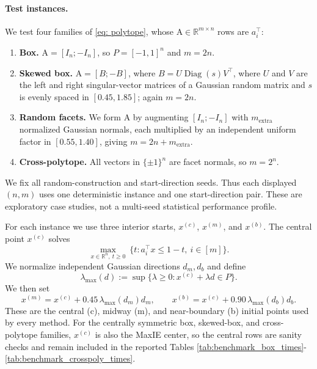 \documentclass[smallextended]{svjour3}
\DeclareMathOperator{\Diag}{Diag}
\newcommand{\R}{\mathbb{R}}
\begin{document}
\paragraph{Test instances.}
We test four families of \eqref{eq: polytope}, whose
$\mathrm{A}\in\R^{m\times n}$ rows are $a_i^\top$:
\begin{enumerate}
\item \textbf{Box.} $\mathrm{A}=[I_n;-I_n]$, so $P=[-1,1]^n$ and $m=2n$.
\item \textbf{Skewed box.} $\mathrm{A}=[B;-B]$, where
$B=U\Diag(s)V^\top$, where $U$ and $V$ are the left and right singular-vector
matrices of a Gaussian random matrix and $s$ is evenly spaced in
$[0.45,1.85]$; again $m=2n$.
\item \textbf{Random facets.} We form $\mathrm{A}$ by augmenting $[I_n;-I_n]$ with
$m_{\mathrm{extra}}$ normalized Gaussian normals, each multiplied by an
independent uniform factor in $[0.55,1.40]$, giving
$m=2n+m_{\mathrm{extra}}$.
\item \textbf{Cross-polytope.} All vectors in $\{\pm1\}^n$ are facet normals, so
$m=2^n$.
\end{enumerate}
We fix all random-construction and start-direction seeds. Thus each displayed
$(n,m)$ uses one deterministic instance and one start-direction pair. These are
exploratory case studies, not a multi-seed statistical performance profile.


For each instance we use three interior starts, $x^{(c)}$, $x^{(m)}$, and
$x^{(b)}$. The central point $x^{(c)}$ solves
\[
    \max_{x\in \R^n,\ t\ge 0}\ \{t: a_i^\top x \le 1-t,\ i\in [m]\}.
\]
We normalize independent Gaussian directions $d_m,d_b$ and define
\[
    \lambda_{\max}(d)
    :=
    \sup\{\lambda\ge 0: x^{(c)}+\lambda d \in P\}.
\]
We then set
\[
    x^{(m)} = x^{(c)} + 0.45\,\lambda_{\max}(d_m)d_m,
    \qquad
    x^{(b)} = x^{(c)} + 0.90\,\lambda_{\max}(d_b)d_b.
\]
These are the central (c), midway (m), and near-boundary (b) initial points used
by every method.
For the centrally symmetric box, skewed-box, and cross-polytope families,
$x^{(c)}$ is also the MaxIE center, so the central rows are sanity checks and
remain included in the reported Tables \ref{tab:benchmark_box_times}-\ref{tab:benchmark_crosspoly_times}. 
\end{document}
